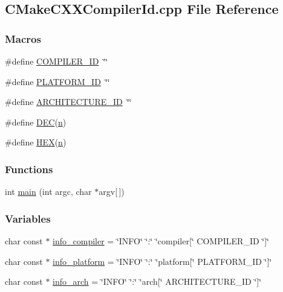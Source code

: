 \hypertarget{a00098}{}\subsection{C\+Make\+C\+X\+X\+Compiler\+Id.\+cpp File Reference}
\label{a00098}
\subsubsection*{Macros}
\begin{DoxyCompactItemize}
\item 
\#define \hyperlink{a00098_a81dee0709ded976b2e0319239f72d174}{C\+O\+M\+P\+I\+L\+E\+R\+\_\+\+I\+D}~\char`\"{}\char`\"{}
\item 
\#define \hyperlink{a00098_adbc5372f40838899018fadbc89bd588b}{P\+L\+A\+T\+F\+O\+R\+M\+\_\+\+I\+D}~\char`\"{}\char`\"{}
\item 
\#define \hyperlink{a00098_aba35d0d200deaeb06aee95ca297acb28}{A\+R\+C\+H\+I\+T\+E\+C\+T\+U\+R\+E\+\_\+\+I\+D}~\char`\"{}\char`\"{}
\item 
\#define \hyperlink{a00098_ad1280362da42492bbc11aa78cbf776ad}{D\+E\+C}(\hyperlink{a00107_ae4e1b71ca84b7ff488e42aa1b6b485ce}{n})
\item 
\#define \hyperlink{a00098_a46d5d95daa1bef867bd0179594310ed5}{H\+E\+X}(\hyperlink{a00107_ae4e1b71ca84b7ff488e42aa1b6b485ce}{n})
\end{DoxyCompactItemize}
\subsubsection*{Functions}
\begin{DoxyCompactItemize}
\item 
int \hyperlink{a00098_a0ddf1224851353fc92bfbff6f499fa97}{main} (int argc, char $\ast$argv\mbox{[}$\,$\mbox{]})
\end{DoxyCompactItemize}
\subsubsection*{Variables}
\begin{DoxyCompactItemize}
\item 
char const $\ast$ \hyperlink{a00098_a4b0efeb7a5d59313986b3a0390f050f6}{info\+\_\+compiler} = \char`\"{}I\+N\+F\+O\char`\"{} \char`\"{}\+:\char`\"{} \char`\"{}compiler\mbox{[}\char`\"{} C\+O\+M\+P\+I\+L\+E\+R\+\_\+\+I\+D \char`\"{}\mbox{]}\char`\"{}
\item 
char const $\ast$ \hyperlink{a00098_a2321403dee54ee23f0c2fa849c60f7d4}{info\+\_\+platform} = \char`\"{}I\+N\+F\+O\char`\"{} \char`\"{}\+:\char`\"{} \char`\"{}platform\mbox{[}\char`\"{} P\+L\+A\+T\+F\+O\+R\+M\+\_\+\+I\+D \char`\"{}\mbox{]}\char`\"{}
\item 
char const $\ast$ \hyperlink{a00098_a59647e99d304ed33b15cb284c27ed391}{info\+\_\+arch} = \char`\"{}I\+N\+F\+O\char`\"{} \char`\"{}\+:\char`\"{} \char`\"{}arch\mbox{[}\char`\"{} A\+R\+C\+H\+I\+T\+E\+C\+T\+U\+R\+E\+\_\+\+I\+D \char`\"{}\mbox{]}\char`\"{}
\end{DoxyCompactItemize}



